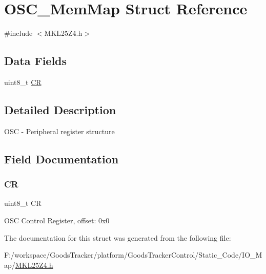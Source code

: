 \hypertarget{struct_o_s_c___mem_map}{}\section{O\+S\+C\+\_\+\+Mem\+Map Struct Reference}
\label{struct_o_s_c___mem_map}


{\ttfamily \#include $<$M\+K\+L25\+Z4.\+h$>$}

\subsection*{Data Fields}
\begin{DoxyCompactItemize}
\item 
uint8\+\_\+t \hyperlink{struct_o_s_c___mem_map_a33c47d54cdd44fb7e84b19e407383748}{CR}
\end{DoxyCompactItemize}


\subsection{Detailed Description}
O\+SC -\/ Peripheral register structure 

\subsection{Field Documentation}
\mbox{\label{struct_o_s_c___mem_map_a33c47d54cdd44fb7e84b19e407383748}} 
\subsubsection{\texorpdfstring{CR}{CR}}
{\footnotesize\ttfamily uint8\+\_\+t CR}

O\+SC Control Register, offset\+: 0x0 

The documentation for this struct was generated from the following file\+:\begin{DoxyCompactItemize}
\item 
F\+:/workspace/\+Goods\+Tracker/platform/\+Goods\+Tracker\+Control/\+Static\+\_\+\+Code/\+I\+O\+\_\+\+Map/\hyperlink{_m_k_l25_z4_8h}{M\+K\+L25\+Z4.\+h}\end{DoxyCompactItemize}
